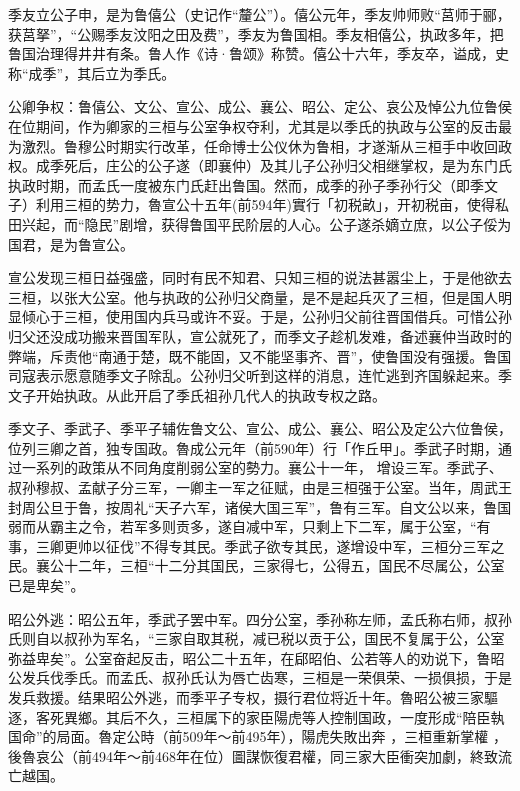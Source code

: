季友立公子申，是为鲁僖公（史记作“釐公”）。僖公元年，季友帅师败“莒师于郦，获莒拏”，“公赐季友汶阳之田及费”，季友为鲁国相。季友相僖公，执政多年，把鲁国治理得井井有条。鲁人作《诗·鲁颂》称赞。僖公十六年，季友卒，谥成，史称“成季”，其后立为季氏。

公卿争权：鲁僖公、文公、宣公、成公、襄公、昭公、定公、哀公及悼公九位鲁侯在位期间，作为卿家的三桓与公室争权夺利，尤其是以季氏的执政与公室的反击最为激烈。鲁穆公时期实行改革，任命博士公仪休为鲁相，才遂渐从三桓手中收回政权。成季死后，庄公的公子遂（即襄仲）及其儿子公孙归父相继掌权，是为东门氏执政时期，而孟氏一度被东门氏赶出鲁国。然而，成季的孙子季孙行父（即季文子）利用三桓的势力，魯宣公十五年(前594年)實行「初税畝」，开初税亩，使得私田兴起，而“隐民”剧增，获得鲁国平民阶层的人心。公子遂杀嫡立庶，以公子俀为国君，是为鲁宣公。

宣公发现三桓日益强盛，同时有民不知君、只知三桓的说法甚嚣尘上，于是他欲去三桓，以张大公室。他与执政的公孙归父商量，是不是起兵灭了三桓，但是国人明显倾心于三桓，使用国内兵马或许不妥。于是，公孙归父前往晋国借兵。可惜公孙归父还没成功搬来晋国军队，宣公就死了，而季文子趁机发难，备述襄仲当政时的弊端，斥责他“南通于楚，既不能固，又不能坚事齐、晋”，使鲁国没有强援。鲁国司寇表示愿意随季文子除乱。公孙归父听到这样的消息，连忙逃到齐国躲起来。季文子开始执政。从此开启了季氏祖孙几代人的执政专权之路。

季文子、季武子、季平子辅佐鲁文公、宣公、成公、襄公、昭公及定公六位鲁侯，位列三卿之首，独专国政。魯成公元年（前590年）行「作丘甲」。季武子时期，通过一系列的政策从不同角度削弱公室的勢力。襄公十一年， 增设三军。季武子、叔孙穆叔、孟献子分三军，一卿主一军之征赋，由是三桓强于公室。当年，周武王封周公旦于鲁，按周礼“天子六军，诸侯大国三军”，鲁有三军。自文公以来，鲁国弱而从霸主之令，若军多则贡多，遂自减中军，只剩上下二军，属于公室，“有事，三卿更帅以征伐”不得专其民。季武子欲专其民，遂增设中军，三桓分三军之民。襄公十二年，三桓“十二分其国民，三家得七，公得五，国民不尽属公，公室已是卑矣”。

昭公外逃：昭公五年，季武子罢中军。四分公室，季孙称左师，孟氏称右师，叔孙氏则自以叔孙为军名，“三家自取其税，减已税以贡于公，国民不复属于公，公室弥益卑矣”。公室奋起反击，昭公二十五年，在郈昭伯、公若等人的劝说下，鲁昭公发兵伐季氏。而孟氏、叔孙氏认为唇亡齿寒，三桓是一荣俱荣、一损俱损，于是发兵救援。结果昭公外逃，而季平子专权，摄行君位将近十年。魯昭公被三家驅逐，客死異鄉。其后不久，三桓属下的家臣陽虎等人控制国政，一度形成“陪臣執国命”的局面。魯定公時（前509年～前495年），陽虎失敗出奔 ，三桓重新掌權 ，後魯哀公（前494年～前468年在位）圖謀恢復君權，同三家大臣衝突加劇，終致流亡越国。

